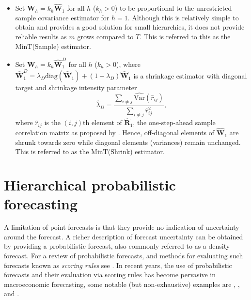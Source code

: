 \documentclass[graybox]{svmult}
\begin{document}
\begin{itemize}
	\item Set $\bm{W}_{h}=k_{h}\hat{\bm{W}}_{1}$ for all $h$ ($k_{h} > 0$) to be proportional to the unrestricted sample covariance estimator for $h=1$. Although this is relatively simple to obtain and provides a good solution for small hierarchies, it does not provide reliable results as $m$ grows compared to $T$. This is referred to this as the MinT(Sample) estimator.

	\item Set $\bm{W}_{h}=k_{h}\hat{\bm{W}}_{1}^D$ for all $h$ ($k_{h} > 0$), where $\hat{\bm{W}}^{D}_{1} = \lambda_{D} \text{diag}(\hat{\bm{W}}_{1}) + (1 - \lambda_{D})\hat{\bm{W}}_{1}$ is a shrinkage estimator with diagonal target and shrinkage intensity parameter
  $$
    \hat{\lambda}_{D} = \frac{\sum_{i \ne j}\hat{\text{Var}}(\hat{r}_{ij})}{\sum_{i \ne j}\hat{r}_{ij}^2},
  $$
	where $\hat{r}_{ij}$ is the $(i,j)$th element of $\hat{\bm{R}}_{1}$, the one-step-ahead sample correlation matrix as proposed by \citet{Schafer2005}. Hence, off-diagonal elements of $\hat{\bm{W}}_1$ are shrunk towards zero while diagonal elements (variances) remain unchanged. This is referred to as the MinT(Shrink) estimator.
\end{itemize}

\section{Hierarchical probabilistic forecasting}

A limitation of point forecasts is that they provide no indication of uncertainty around the forecast. A richer description of forecast uncertainty can be obtained by providing a probabilistic forecast, also commonly referred to as a density forecast. For a review of probabilistic forecasts, and methods for evaluating such forecasts known as {\em scoring rules} see  \citep{Gneiting2014}. In recent years, the use of probabilistic forecasts and their evaluation via scoring rules has become pervasive in macroeconomic forecasting, some notable (but non-exhaustive) examples are \cite{GewAmi2010}, \cite{BilEtAl2013}, \cite{CarEtAl2015} and \cite{ClaRav2015}.

\end{document}
